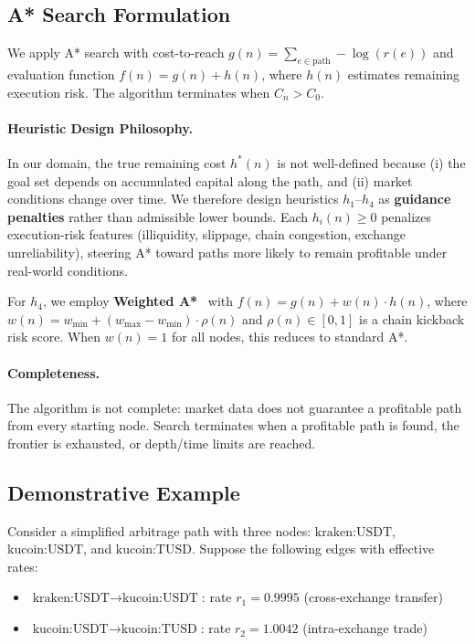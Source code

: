 \subsection{A* Search Formulation}

We apply A* search with cost-to-reach $g(n) = \sum_{e\in \text{path}} -\log(r(e))$ and evaluation function $f(n) = g(n) + h(n)$, where $h(n)$ estimates remaining execution risk. The algorithm terminates when $C_n > C_0$.

\paragraph{Heuristic Design Philosophy.}
In our domain, the true remaining cost $h^*(n)$ is not well-defined because (i) the goal set depends on accumulated capital along the path, and (ii) market conditions change over time. We therefore design heuristics $h_1$--$h_4$ as \textbf{guidance penalties} rather than admissible lower bounds. Each $h_i(n) \geq 0$ penalizes execution-risk features (illiquidity, slippage, chain congestion, exchange unreliability), steering A* toward paths more likely to remain profitable under real-world conditions.

For $h_4$, we employ \textbf{Weighted A*}~\cite{pohl1970weighted} with $f(n) = g(n) + w(n) \cdot h(n)$, where $w(n) = w_{\min} + (w_{\max} - w_{\min}) \cdot \rho(n)$ and $\rho(n) \in [0,1]$ is a chain kickback risk score. When $w(n)=1$ for all nodes, this reduces to standard A*.

\paragraph{Completeness.}
The algorithm is not complete: market data does not guarantee a profitable path from every starting node. Search terminates when a profitable path is found, the frontier is exhausted, or depth/time limits are reached.

\subsection{Demonstrative Example}

Consider a simplified arbitrage path with three nodes: $\text{kraken:USDT}$, $\text{kucoin:USDT}$, and $\text{kucoin:TUSD}$. Suppose the following edges with effective rates:

\begin{itemize}
\item $\text{kraken:USDT} \to \text{kucoin:USDT}$: rate $r_1 = 0.9995$ (cross-exchange transfer)
\item $\text{kucoin:USDT} \to \text{kucoin:TUSD}$: rate $r_2 = 1.0042$ (intra-exchange trade)
\end{itemize}

